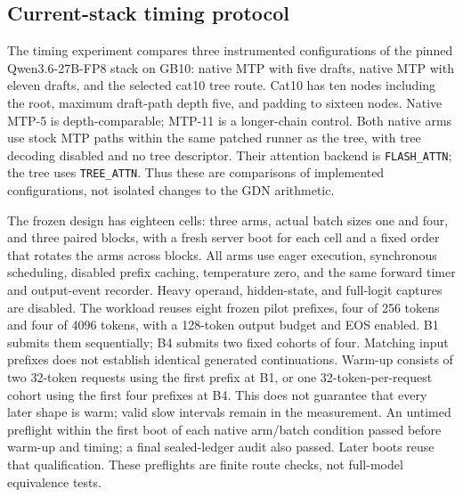 \subsection{Current-stack timing protocol}
\label{sec:e1-timing}
The timing experiment compares three instrumented configurations of the pinned Qwen3.6-27B-FP8 stack on GB10: native MTP with five drafts, native MTP with eleven drafts, and the selected cat10 tree route. Cat10 has ten nodes including the root, maximum draft-path depth five, and padding to sixteen nodes. Native MTP-5 is depth-comparable; MTP-11 is a longer-chain control. Both native arms use stock MTP paths within the same patched runner as the tree, with tree decoding disabled and no tree descriptor. Their attention backend is \texttt{FLASH\_ATTN}; the tree uses \texttt{TREE\_ATTN}. Thus these are comparisons of implemented configurations, not isolated changes to the GDN arithmetic.

The frozen design has eighteen cells: three arms, actual batch sizes one and four, and three paired blocks, with a fresh server boot for each cell and a fixed order that rotates the arms across blocks. All arms use eager execution, synchronous scheduling, disabled prefix caching, temperature zero, and the same forward timer and output-event recorder. Heavy operand, hidden-state, and full-logit captures are disabled. The workload reuses eight frozen pilot prefixes, four of 256 tokens and four of 4096 tokens, with a 128-token output budget and EOS enabled. B1 submits them sequentially; B4 submits two fixed cohorts of four. Matching input prefixes does not establish identical generated continuations. Warm-up consists of two 32-token requests using the first prefix at B1, or one 32-token-per-request cohort using the first four prefixes at B4. This does not guarantee that every later shape is warm; valid slow intervals remain in the measurement. An untimed preflight within the first boot of each native arm/batch condition passed before warm-up and timing; a final sealed-ledger audit also passed. Later boots reuse that qualification. These preflights are finite route checks, not full-model equivalence tests.

